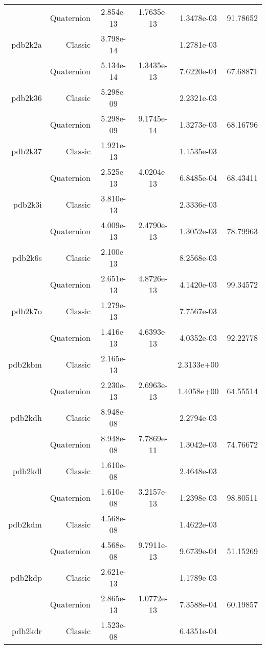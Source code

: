 \begin{xltabular}{\textwidth}{r|rS[table-format=1.3e+2]S[table-format=1.4e+2]S[table-format=1.4e+2]S[table-format=-1.5]}
& Quaternion & 2.854e-13 & 1.7635e-13 & 1.3478e-03 & 91.78652\\  \addlinespace
pdb2k2a & Classic & 3.798e-14 &  & 1.2781e-03 & \\
& Quaternion & 5.134e-14 & 1.3435e-13 & 7.6220e-04 & 67.68871\\  \addlinespace
pdb2k36 & Classic & 5.298e-09 &  & 2.2321e-03 & \\
& Quaternion & 5.298e-09 & 9.1745e-14 & 1.3273e-03 & 68.16796\\  \addlinespace
pdb2k37 & Classic & 1.921e-13 &  & 1.1535e-03 & \\
& Quaternion & 2.525e-13 & 4.0204e-13 & 6.8485e-04 & 68.43411\\  \addlinespace
pdb2k3i & Classic & 3.810e-13 &  & 2.3336e-03 & \\
& Quaternion & 4.009e-13 & 2.4790e-13 & 1.3052e-03 & 78.79963\\  \addlinespace
pdb2k6s & Classic & 2.100e-13 &  & 8.2568e-03 & \\
& Quaternion & 2.651e-13 & 4.8726e-13 & 4.1420e-03 & 99.34572\\  \addlinespace
pdb2k7o & Classic & 1.279e-13 &  & 7.7567e-03 & \\
& Quaternion & 1.416e-13 & 4.6393e-13 & 4.0352e-03 & 92.22778\\  \addlinespace
pdb2kbm & Classic & 2.165e-13 &  & 2.3133e+00 & \\
& Quaternion & 2.230e-13 & 2.6963e-13 & 1.4058e+00 & 64.55514\\  \addlinespace
pdb2kdh & Classic & 8.948e-08 &  & 2.2794e-03 & \\
& Quaternion & 8.948e-08 & 7.7869e-11 & 1.3042e-03 & 74.76672\\  \addlinespace
pdb2kdl & Classic & 1.610e-08 &  & 2.4648e-03 & \\
& Quaternion & 1.610e-08 & 3.2157e-13 & 1.2398e-03 & 98.80511\\  \addlinespace
pdb2kdm & Classic & 4.568e-08 &  & 1.4622e-03 & \\
& Quaternion & 4.568e-08 & 9.7911e-13 & 9.6739e-04 & 51.15269\\  \addlinespace
pdb2kdp & Classic & 2.621e-13 &  & 1.1789e-03 & \\
& Quaternion & 2.865e-13 & 1.0772e-13 & 7.3588e-04 & 60.19857\\  \addlinespace
pdb2kdr & Classic & 1.523e-08 &  & 6.4351e-04 & \\

\end{xltabular}
